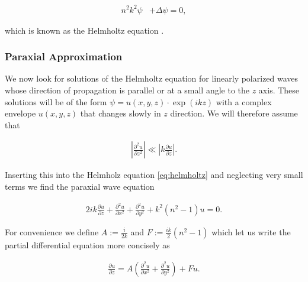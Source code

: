 \begin{align} \label{eq:helmholtz}
    n^2 k^2 \psi & + \Delta \psi = 0,
\end{align}

which is known as the Helmholtz equation \cite{PriciplesOfOptics}.


\subsubsection{Paraxial Approximation} \label{sec:paraxial_equation}

We now look for solutions of the Helmholtz equation for linearly polarized waves whose direction of propagation is parallel or at a small angle to the $z$ axis. These solutions will be of the form $\psi = u(x,y,z) \cdot \exp(i k z)$ with a complex envelope $u(x,y,z)$ that changes slowly in $z$ direction. We will therefore assume that

\begin{align*}
\left| \frac{\partial^2 u}{\partial z^2} \right| \ll \left|  k \frac{\partial u}{\partial z}  \right|.
\end{align*}

Inserting this into the Helmholz equation \eqref{eq:helmholtz} and neglecting very small terms we find the paraxial wave equation

\begin{align*}
2 i k \frac{\partial u}{\partial z} + \frac{\partial^2 u}{\partial x^2} + \frac{\partial^2 u}{\partial y^2} + k^2 (n^2 - 1) u = 0.
\end{align*}

For convenience we define $A := \frac{i}{2k}$ and $F := \frac{ik}{2} (n^2 - 1) $ which let us write the partial differential equation more concisely as

\begin{align} \label{eq:paraxial_wave_equation}
\frac{\partial u}{\partial z} = A \left( \frac{\partial^2 u}{\partial x^2} + \frac{\partial^2 u}{\partial y^2} \right) + F  u.
\end{align}
